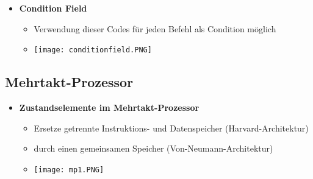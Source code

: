 \begin{itemize}
        \item \textbf{Condition Field}
            \begin{itemize}
                \item Verwendung dieser Codes für jeden Befehl als Condition möglich
                \item[] \texttt{[image: conditionfield.PNG]}
            \end{itemize}
    \end{itemize}

\subsection{Mehrtakt-Prozessor}
    \begin{itemize}
        \item \textbf{Zustandselemente im Mehrtakt-Prozessor}
            \begin{itemize}
                \item Ersetze getrennte Instruktions- und Datenspeicher (Harvard-Architektur)
                \item durch einen gemeinsamen Speicher (Von-Neumann-Architektur)
                \item[] \texttt{[image: mp1.PNG]}
            \end{itemize}


\end{itemize}
